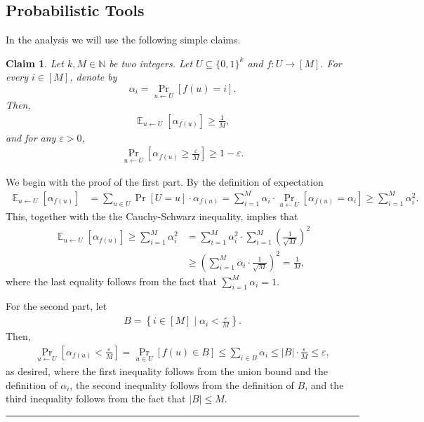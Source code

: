 \documentclass[11pt]{article}
\theoremstyle{plain}
\newtheorem{claim}[theorem]{Claim}
\theoremstyle{definition}
\numberwithin{equation}{section}
\newcommand{\qedsymb}{\hfill{\rule{2mm}{2mm}}}
\renewenvironment{proof}{\begin{trivlist} \item[\hspace{\labelsep}{\bf
\noindent Proof.\/}] }{\qedsymb\end{trivlist}}
\numberwithin{equation}{section} \newcommand{\aka} {also known as\ }
\newcommand\E{\mathop{\mathbb E}}
\def\epsilon{\varepsilon}
\newcommand{\1}{\mathbf{1}}
\def\({\left(}
\def\){\right)}
\theoremstyle{remark}
\def\({\left(}
\def\){\right)}
\begin{document}
\subsection*{Probabilistic Tools}
In the analysis we will use the following simple claims.

\begin{claim}\label{claim:prob}
  Let $k,M\in\mathbb{N}$ be two integers. Let $U\subseteq\{0,1\}^k$ and $f\colon
  U\rightarrow
  [M]$.  For every $i\in[M]$, denote
  by $$\alpha_i=\Pr_{u\leftarrow U}\left[f(u)=i\right].$$ Then,
  \begin{align*}
    \E_{u\leftarrow U}\left[\alpha_{f(u)}\right]\geq\frac{1}{M},
  \end{align*}
  and for any $\epsilon>0$,
  \begin{align*}
    \Pr_{u\leftarrow U}\left[\alpha_{f(u)}\geq \frac{\epsilon}{M}\right]\geq
    1-\epsilon.
  \end{align*}
\end{claim}
\begin{proof}We begin with the proof of the first part. By the definition of expectation
  \begin{align*}
    \E_{u\leftarrow U}\left[\alpha_{f(u)}\right] & =
    \sum_{u\in U}\Pr[U=u]\cdot \alpha_{f(u)}=
    \sum_{i=1}^M\alpha_i\cdot\Pr_{u\leftarrow
      U}\left[\alpha_{f(u)}=\alpha_i\right] \geq \sum_{i=1}^{M} \alpha_i^2.
  \end{align*}
 This, together with the the Cauchy-Schwarz inequality, implies that
  \begin{align*}
    \E_{u\leftarrow U}\left[\alpha_{f(u)}\right] \geq \sum_{i=1}^{M} \alpha_i^2 &=
    \sum_{i=1}^{M} \alpha_i^2 \cdot \sum_{i=1}^M \(\frac{1}{\sqrt{M}}\)^2 \\ &\geq
    \(\sum_{i=1}^M \alpha_i \cdot \frac{1}{\sqrt{M}}\)^2 = \frac{1}{M},
  \end{align*}
  where the last equality follows from the fact that $\sum_{i=1}^M \alpha_i =
  1$.

  For the second part, let
  \begin{align*}
    B=\left\{i\in[M]\mid \alpha_i < \frac{\epsilon}{M}\right\}.
  \end{align*}
  Then,
  \begin{align*}
    \Pr_{u\leftarrow U}\left[\alpha_{f(u)} < \frac{\epsilon}{M}\right] =
    \Pr_{u \in U}[f(u)\in B]\leq \sum_{i\in B}\alpha_i\leq
    |B|\cdot\frac{\epsilon}{M}\leq \epsilon,
  \end{align*}
  as desired, where the first inequality follows from the union bound and the
  definition of $\alpha_i$, the second
  inequality follows from the definition of $B$, and the third inequality follows
  from the fact that $|B|\leq M$.
\end{proof}
\end{document}
